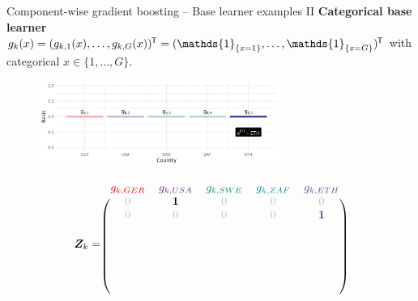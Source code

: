 \documentclass[10pt]{beamer}
\begin{document}
\begin{frame}{Component-wise gradient boosting -- Base learner examples II}
  \textbf{Categorical base learner} $g_k(x) = (g_{k,1}(x), \dots, g_{k,G}(x))^\tran = (\mathds{1}_{\{x = 1\}}, \dots, \mathds{1}_{\{x = G\}})^\tran$ with categorical $x\in\{1, \dots, G\}$.

  \begin{center}
    \begin{figure}
      \includegraphics[width=0.7\textwidth]{figures/bs-cat/fig-cat2.png}
    \end{figure}
    \vspace{-0.5cm}
    \scriptsize
    $$
      \design_k = \begin{blockarray}{ccccc}
        \color[HTML]{EE0000}g_{k,GER} & \color[HTML]{631879}g_{k,USA} & \color[HTML]{008B45}g_{k,SWE} & \color[HTML]{008280}g_{k,ZAF} & \color[HTML]{3B4992}g_{k,ETH}\\
      \begin{block}{(ccccc)}
        \color{lightgray}0 & \color{black}\bm{1} & \color{lightgray}0 & \color{lightgray}0 & \color{lightgray}0 \\
      \color{lightgray}0 & \color{lightgray}0 & \color{lightgray}0 & \color{lightgray}0 & \color[HTML]{3B4992}\bm{1} \\
      \color{white}0 & \color{white}0 & \color{white}0 & \color{white}0 & \color{white}0 \\
      \color{white}\vdots & \color{white}\vdots & \color{white}\vdots & \color{white}\vdots & \color{white}\vdots \\
      \color{white}0 & \color{white}0 & \color{white}0 & \color{white}0 & \color{white}0 \\
      \color{white}0 & \color{white}0 & \color{white}0 & \color{white}0 & \color{white}0 \\
      \color{white}0 & \color{white}0 & \color{white}0 & \color{white}0 & \color{white}0 \color{black}\\
      \end{block}
    \end{blockarray}
    $$
    \normalsize
  \end{center}
\end{frame}
\end{document}

